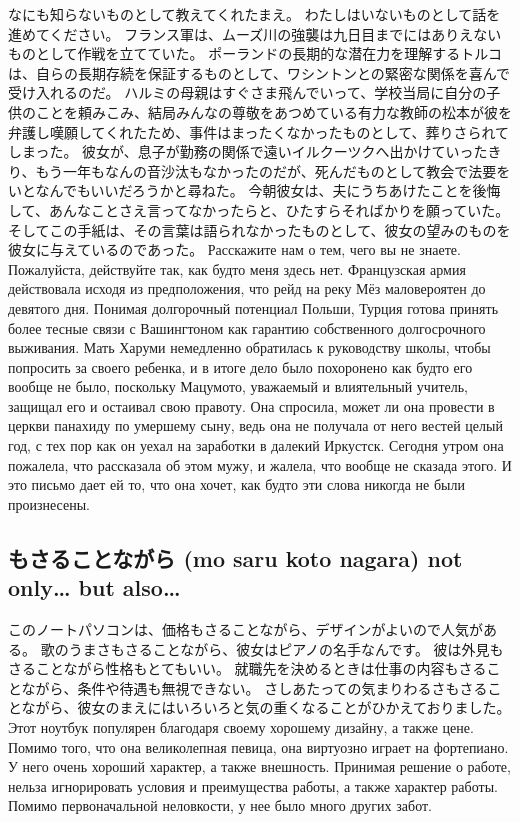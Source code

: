 なにも知らないものとして教えてくれたまえ。
わたしはいないものとして話を進めてください。
フランス軍は、ムーズ川の強襲は九日目までにはありえないものとして作戦を立てていた。
ポーランドの長期的な潜在力を理解するトルコは、自らの長期存続を保証するものとして、ワシントンとの緊密な関係を喜んで受け入れるのだ。
ハルミの母親はすぐさま飛んでいって、学校当局に自分の子供のことを頼みこみ、結局みんなの尊敬をあつめている有力な教師の松本が彼を弁護し嘆願してくれたため、事件はまったくなかったものとして、葬りさられてしまった。
彼女が、息子が勤務の関係で遠いイルクーツクへ出かけていったきり、もう一年もなんの音沙汰もなかったのだが、死んだものとして教会で法要をいとなんでもいいだろうかと尋ねた。
今朝彼女は、夫にうちあけたことを後悔して、あんなことさえ言ってなかったらと、ひたすらそればかりを願っていた。そしてこの手紙は、その言葉は語られなかったものとして、彼女の望みのものを彼女に与えているのであった。
Расскажите нам о тем, чего вы не знаете.
Пожалуйста, действуйте так, как будто меня здесь нет.
Французская армия действовала исходя из предположения, что рейд на реку Мёз маловероятен до девятого дня.
Понимая долгорочный потенциал Польши, Турция готова принять более тесные связи с Вашингтоном как гарантию собственного долгосрочного выживания.
Мать Харуми немедленно обратилась к руководству школы, чтобы попросить за своего ребенка, и в итоге дело было похоронено как будто его вообще не было, поскольку Мацумото, уважаемый и влиятельный учитель, защищал его и остаивал свою правоту.
Она спросила, может ли она провести в церкви панахиду по умершему сыну, ведь она не получала от него вестей целый год, с тех пор как он уехал на заработки в далекий Иркустск.
Сегодня утром она пожалела, что рассказала об этом мужу, и жалела, что вообще не сказада этого. И это письмо дает ей то, что она хочет, как будто эти слова никогда не были произнесены.

\subsection{もさることながら (mo saru koto nagara)  not only… but also… }

このノートパソコンは、価格もさることながら、デザインがよいので人気がある。
歌のうまさもさることながら、彼女はピアノの名手なんです。
彼は外見もさることながら性格もとてもいい。
就職先を決めるときは仕事の内容もさることながら、条件や待遇も無視できない。
さしあたっての気まりわるさもさることながら、彼女のまえにはいろいろと気の重くなることがひかえておりました。
Этот ноутбук популярен благодаря своему хорошему дизайну, а также цене.
Помимо того, что она великолепная певица, она виртуозно играет на фортепиано.
У него очень хороший характер, а также внешность.
Принимая решение о работе, нельза игнорировать условия и преимущества работы, а также характер работы.
Помимо первоначальной неловкости, у нее было много других забот.

